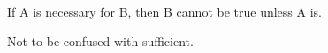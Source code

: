 If A is necessary for B, then B cannot be true unless
A is.
\par
Not to be confused with sufficient.